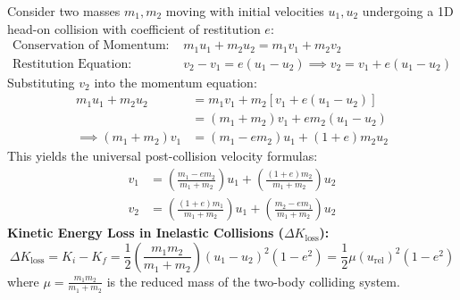 \documentclass[10pt,twoside,openright]{book}
\begin{document}
\begin{formulabox}
Consider two masses $m_1, m_2$ moving with initial velocities $u_1, u_2$ undergoing a 1D head-on collision with coefficient of restitution $e$:
\begin{align}
  \text{Conservation of Momentum: } &m_1 u_1 + m_2 u_2 = m_1 v_1 + m_2 v_2 \\
  \text{Restitution Equation: } &v_2 - v_1 = e(u_1 - u_2) \implies v_2 = v_1 + e(u_1 - u_2)
\end{align}
Substituting $v_2$ into the momentum equation:
\begin{align}
  m_1 u_1 + m_2 u_2 &= m_1 v_1 + m_2[v_1 + e(u_1 - u_2)] \nonumber \\
  &= (m_1 + m_2)v_1 + e m_2(u_1 - u_2) \nonumber \\
  \implies (m_1 + m_2)v_1 &= (m_1 - e m_2)u_1 + (1+e)m_2 u_2
\end{align}
This yields the universal post-collision velocity formulas:
\begin{align}
  v_1 &= \left(\frac{m_1 - e m_2}{m_1 + m_2}\right)u_1 + \left(\frac{(1+e)m_2}{m_1 + m_2}\right)u_2 \\
  v_2 &= \left(\frac{(1+e)m_1}{m_1 + m_2}\right)u_1 + \left(\frac{m_2 - e m_1}{m_1 + m_2}\right)u_2
\end{align}
\textbf{Kinetic Energy Loss in Inelastic Collisions ($\Delta K_{\text{loss}}$):}
\begin{equation}
  \Delta K_{\text{loss}} = K_i - K_f = \frac{1}{2}\left(\frac{m_1 m_2}{m_1 + m_2}\right)(u_1 - u_2)^2(1 - e^2) = \frac{1}{2}\mu (u_{\text{rel}})^2(1 - e^2)
\end{equation}
where $\mu = \frac{m_1 m_2}{m_1 + m_2}$ is the reduced mass of the two-body colliding system.
\end{formulabox}
\end{document}
